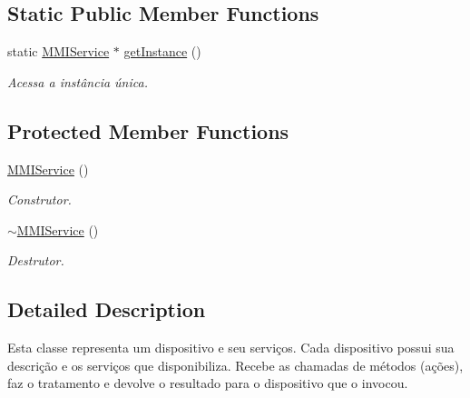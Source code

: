 \subsection*{Static Public Member Functions}
\begin{DoxyCompactItemize}
\item 
static \hyperlink{classbr_1_1ufscar_1_1lince_1_1mmi_1_1upnp_1_1MMIService}{MMIService} $\ast$ \hyperlink{classbr_1_1ufscar_1_1lince_1_1mmi_1_1upnp_1_1MMIService_a369cf8700f091154c446028e26c65cce}{getInstance} ()
\begin{DoxyCompactList}\small\item\em Acessa a instância única. \item\end{DoxyCompactList}\end{DoxyCompactItemize}
\subsection*{Protected Member Functions}
\begin{DoxyCompactItemize}
\item 
\hyperlink{classbr_1_1ufscar_1_1lince_1_1mmi_1_1upnp_1_1MMIService_a02cbbb28a8831c5c5d535fc76111eb96}{MMIService} ()
\begin{DoxyCompactList}\small\item\em Construtor. \item\end{DoxyCompactList}\item 
\hyperlink{classbr_1_1ufscar_1_1lince_1_1mmi_1_1upnp_1_1MMIService_a549825fd03af5db240df7435e66fe9fb}{$\sim$MMIService} ()
\begin{DoxyCompactList}\small\item\em Destrutor. \item\end{DoxyCompactList}\end{DoxyCompactItemize}


\subsection{Detailed Description}
Esta classe representa um dispositivo e seu serviços. Cada dispositivo possui sua descrição e os serviços que disponibiliza. Recebe as chamadas de métodos (ações), faz o tratamento e devolve o resultado para o dispositivo que o invocou. 

